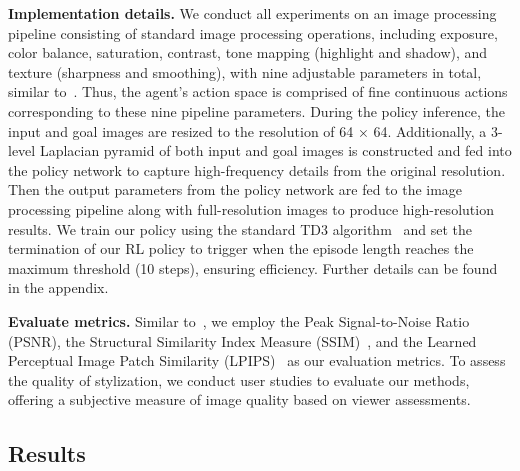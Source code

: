 \documentclass{article}
\newcommand{\pipeline}{image processing pipeline\xspace}
\begin{document}
\noindent\textbf{Implementation details.} We conduct all experiments on an \pipeline consisting of standard image processing operations, including exposure, color balance, saturation, contrast, tone mapping (highlight and shadow), and texture (sharpness and smoothing), with nine adjustable parameters in total, similar to~\cite{tseng2022neural}. Thus, the agent's action space is comprised of fine continuous actions corresponding to these nine pipeline parameters. 
During the policy inference, the input and goal images are resized to the resolution of 64 × 64. Additionally, a 3-level Laplacian pyramid of both input and goal images is constructed and fed into the policy network to capture high-frequency details from the original resolution. Then the output parameters from the policy network are fed to the \pipeline along with full-resolution images to produce high-resolution results. 
We train our policy using the standard TD3 algorithm~\cite{fujimoto2018addressing-td3} and set the termination of our RL policy to trigger when the episode length reaches the maximum threshold (10 steps), ensuring efficiency. Further details can be found in the appendix.


\noindent\textbf{Evaluate metrics.} 
Similar to~\cite{hu2018exposure, tseng2019hyperparameter, tseng2022neural}, we employ the Peak Signal-to-Noise Ratio (PSNR), the Structural Similarity Index Measure (SSIM)~\cite{wang2004image}, and the Learned Perceptual Image Patch Similarity (LPIPS)~\cite{zhang2018unreasonable} as our evaluation metrics. To assess the quality of stylization, we conduct user studies to evaluate our methods, offering a subjective measure of image quality based on viewer assessments.



\vspace{-5pt}
\subsection{Results}
\vspace{-5pt}
\end{document}
